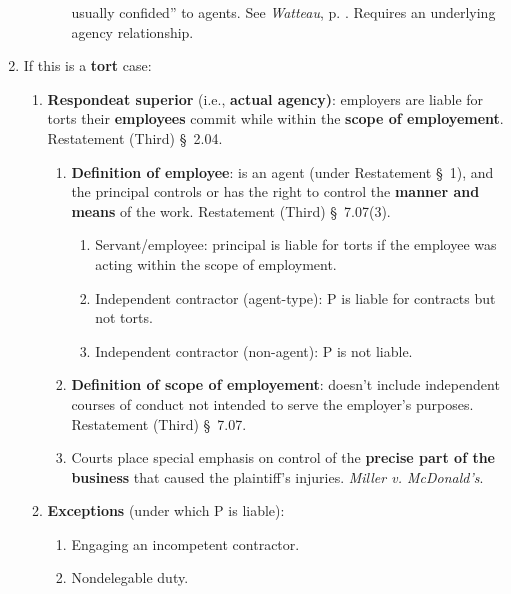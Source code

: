 \begin{enumerate}
\begin{enumerate}
\begin{enumerate}
            usually confided'' to agents. See \emph{Watteau}, p. 
            \pageref{par:watteau}. Requires an underlying agency 
            relationship.
        \end{enumerate}
    \end{enumerate}
    \item If this is a \textbf{tort} case:
    \begin{enumerate}
        \item \textbf{Respondeat superior} (i.e., \textbf{actual agency)}: employers are liable for torts 
        their \textbf{employees} commit while within the \textbf{scope of 
        employement}. Restatement (Third) \S\ 2.04.
        \begin{enumerate}
            \item \textbf{Definition of employee}: is an agent (under 
            Restatement \S\ 1), and the principal controls or has the right to 
            control the \textbf{manner and means} of the work. Restatement 
            (Third) \S\ 7.07(3).
            \begin{enumerate}
                \item Servant/employee: principal is liable for torts if the 
                employee was acting within the scope of employment.
                \item Independent contractor (agent-type): P is liable for 
                contracts but not torts.
                \item Independent contractor (non-agent): P is not liable.
            \end{enumerate}
            \item \textbf{Definition of scope of employement}: doesn't include 
            independent courses of conduct not intended to serve the 
            employer's purposes. Restatement (Third) \S\ 7.07.  
            \item Courts place special emphasis on control of the 
            \textbf{precise part of the business} that caused the plaintiff's 
            injuries. \emph{Miller v. McDonald's}.
        \end{enumerate}
        \item \textbf{Exceptions} (under which P is liable):
        \begin{enumerate}
            \item Engaging an incompetent contractor.
            \item Nondelegable duty.
        \end{enumerate}

\end{enumerate}
\end{enumerate}
